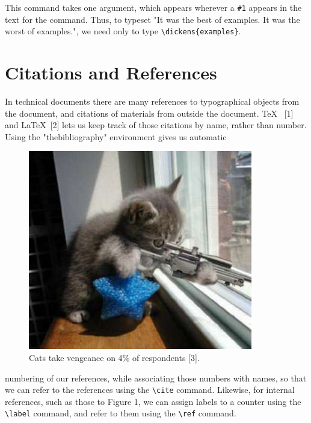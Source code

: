 \documentclass[12pt]{article}
\begin{document}
\noindent This command takes one argument, which appears wherever a \verb|#1| appears
in the text for the command. Thus, to typeset "It was the best of examples.
It was the worst of examples.", we need only to type \verb|\dickens{examples}|.

\section{Citations and References}
In technical documents there are many references to typographical objects
from the document, and citations of materials from outside the document.
\TeX\ \cite{ref1} [1] and \LaTeX\ \cite{ref2}[2] lets us keep track of those citations by name, rather
than number. Using the "thebibliography" environment gives us automatic

\begin{figure}
	\includegraphics[width=\textwidth]{sniper.jpg}
	\caption{Cats take vengeance on 4\% of respondents \cite{ref3}[3]. }
\end{figure}

\noindent numbering of our references, while associating those numbers with names,
so that we can refer to the references using the \verb|\cite| command. Likewise,
for internal references, such as those to Figure 1, we can assign labels to
a counter using the \verb|\label| command, and refer to them using the \verb|\ref|
command.


\end{document}
